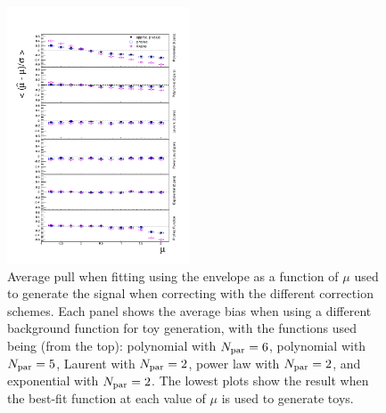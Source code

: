 \begin{figure}[tbp]
\centering
\includegraphics[width=0.48\textwidth]{correction/AllOrderFunctions_call.pdf}
\caption{Average pull when fitting using the envelope as a function of $\mu$
used to generate the signal when correcting
with the different \nll correction schemes.
Each panel shows the average bias when using
a different background function for toy generation, with the functions
used being (from the top): polynomial with $N_{\rm par}=6$,
polynomial with $N_{\rm par}=5$, Laurent with $N_{\rm par}=2$,
power law with $N_{\rm par}=2$, and exponential with $N_{\rm par}=2$.
The lowest plots show the result when the best-fit function at each
value of $\mu$ is used to generate toys.
}
\label{fig:correction:allorderbias}
\end{figure}

